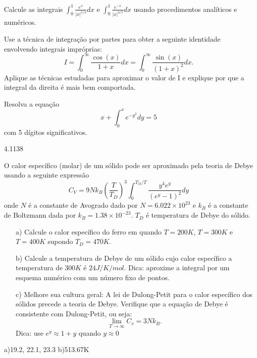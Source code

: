 \begin{Exercise}Calcule as integrais $\int_0^{1}\frac{e^x}{|x|^{1/4}}dx$ e $\int_0^1\frac{e^{-x}}{|x|^{4/5}}dx$ usando procedimentos analíticos e numéricos.
\end{Exercise}

\begin{Exercise} Use a técnica de integração por partes para obter a seguinte identidade envolvendo integrais impróprias:
$$I=\int_0^\infty \frac{\cos(x)}{1+x}dx =\int_0^\infty \frac{\sin(x)}{(1+x)^2}dx.$$
Aplique as técnicas estudadas para aproximar o valor de I e explique por que a integral da direita é mais bem comportada.
\end{Exercise}

\begin{Exercise} Resolva a  equação
$$x+\int_0^x e^{-y^2}dy=5$$
com 5 dígitos significativos.

\end{Exercise}
\begin{Answer}
  \begin{tiny}
4.1138    
  \end{tiny}
\end{Answer}

\begin{Exercise} [title=Ciência dos materiais] O calor específico (molar) de um sólido pode ser aproximado pela teoria de Debye usando a seguinte expressão
$$C_V=9Nk_B\left(\frac{T}{T_D}\right)^3\int_0^{T_D/T} \frac{y^4e^y}{(e^y-1)^2}dy$$
onde $N$ é a constante de Avogrado dado por $N=6.022\times 10^{23}$ e $k_B$ é a constante de Boltzmann dada por $k_B=1.38\times 10^{-23}$. $T_D$ é temperatura de Debye do sólido.
\begin{itemize}
\item[a)] Calcule o calor específico do ferro em quando $T=200K$, $T=300K$ e $T=400K$ supondo $T_D=470K$.
\item[b)] Calcule a temperatura de Debye de um sólido cujo calor específico a temperatura de $300K$ é $24J/K/mol$. Dica: aproxime a integral por um esquema numérico com um número fixo de pontos.
\item[c)] Melhore sua cultura geral: A lei de Dulong-Petit para o calor específico dos sólidos precede a teoria de Debye. Verifique que a equação de Debye é consistente com Dulong-Petit, ou seja: $$\lim_{T\to \infty}C_v=3Nk_B.$$ Dica: use $e^y\approx 1+y$ quando $y\approx 0$
\end{itemize}

\end{Exercise}
\begin{Answer}
  \begin{tiny}
a)19.2, 22.1, 23.3 b)513.67K    
  \end{tiny}
\end{Answer}

% 
